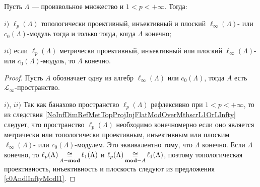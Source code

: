\begin{proposition}\label{c0AndlInftyModlp} Пусть $\Lambda$ --- произвольное множество и $1<p<+\infty$. Тогда:

$i)$ $\ell_p(\Lambda)$ топологически проективный, инъективный и плоский $\ell_\infty(\Lambda)$- или $c_0(\Lambda)$-модуль тогда и только тогда, когда $\Lambda$ конечно;

$ii)$ если $\ell_p(\Lambda)$ метрически проективный, инъективный или плоский $\ell_\infty(\Lambda)$- или $c_0(\Lambda)$-модуль, то $\Lambda$ конечно.
\end{proposition}
\begin{proof} Пусть $A$ обозначает одну из алгебр $\ell_\infty(\Lambda)$ или $c_0(\Lambda)$, тогда $A$ есть $\mathscr{L}_\infty$-пространство. 

$i)$, $ii)$ Так как банахово пространство $\ell_p(\Lambda)$ рефлексивно при $1<p<+\infty$, то из следствия \ref{NoInfDimRefMetTopProjInjFlatModOverMthscrL1OrLInfty} следует, что пространство $\ell_p(\Lambda)$ необходимо конечномерно если оно является метрически или топологически проективным, инъективным или плоским $\ell_\infty(\Lambda)$- или $c_0(\Lambda)$-модулем. Это эквивалентно тому, что $\Lambda$ конечно. Если $\Lambda$ конечно, то $\ell_p(\Lambda)\mathop{\mathbin{\cong}}\limits_{A-\mathbf{mod}}\ell_1(\Lambda)$ и $\ell_p(\Lambda)\mathop{\mathbin{\cong}}\limits_{\mathbf{mod}-A}\ell_1(\Lambda)$, поэтому топологическая проективность, инъективность и плоскость следуют из предложения \ref{c0AndlInftyModl1}.
\end{proof}

